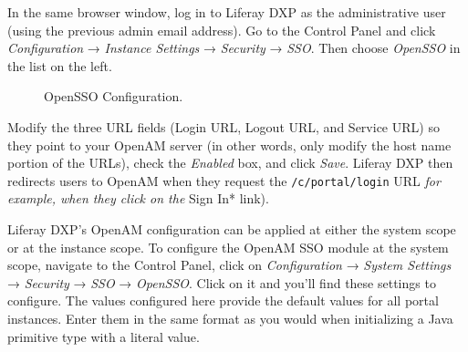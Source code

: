 In the same browser window, log in to Liferay DXP as the administrative
user (using the previous admin email address). Go to the Control Panel
and click \emph{Configuration} → \emph{Instance Settings} →
\emph{Security} → \emph{SSO}. Then choose \emph{OpenSSO} in the list on
the left.

\begin{figure}
\centering
{}
\caption{OpenSSO Configuration.}
\end{figure}

Modify the three URL fields (Login URL, Logout URL, and Service URL) so
they point to your OpenAM server (in other words, only modify the host
name portion of the URLs), check the \emph{Enabled} box, and click
\emph{Save}. Liferay DXP then redirects users to OpenAM when they
request the \texttt{/c/portal/login} URL \emph{for example, when they
click on the }Sign In* link).

Liferay DXP's OpenAM configuration can be applied at either the system
scope or at the instance scope. To configure the OpenAM SSO module at
the system scope, navigate to the Control Panel, click on
\emph{Configuration} → \emph{System Settings} → \emph{Security} →
\emph{SSO} → \emph{OpenSSO}. Click on it and you'll find these settings
to configure. The values configured here provide the default values for
all portal instances. Enter them in the same format as you would when
initializing a Java primitive type with a literal value.


